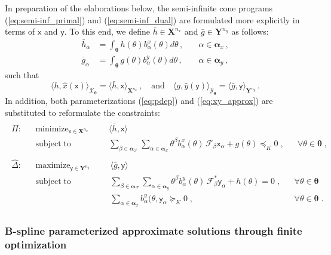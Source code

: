 \documentclass{article}
\DeclareMathOperator*{\minimize}{minimize}
\DeclareMathOperator*{\maximize}{maximize}
\DeclareMathOperator*{\subj}{subject\;to}
\newcommand{\ppar}{\theta}                          %
\newcommand{\Ppar}{{\bm{\theta}}}                   %
\newcommand{\X}{\mathbf{X}}                         %
\newcommand{\Y}{\mathbf{Y}}                         %
\newcommand{\calF}{\mathcal{F}}                     %
\newcommand{\Xm}{{\bm{\mathcal{X}}_{\Ppar}}}        %
\newcommand{\Ym}{{\bm{\mathcal{Y}}_{\Ppar}}}        %
\newcommand{\bx}{b^x}               %
\newcommand{\bxa}{\bx_\alpha}       %
\newcommand{\cx}{\textsf{x}}        %
\newcommand{\cxa}{\cx_\alpha}       %
\newcommand{\nx}{{n_x}}             %
\newcommand{\by}{b^y}               %
\newcommand{\bya}{\by_\alpha}       %
\newcommand{\cy}{\textsf{y}}        %
\newcommand{\cya}{\cy_\alpha}       %
\newcommand{\ny}{{n_y}}             %
\newcommand{\Alpha}{\bm{\alpha}}    %
\newcommand{\meanh}{\bar{h}}        %
\newcommand{\meanha}{\meanh_\alpha} %
\newcommand{\meang}{\bar{g}}        %
\newcommand{\meanga}{\meang_\alpha} %
\begin{document}
In preparation of the elaborations below, the semi-infinite cone programs (\ref{eq:semi-inf_primal}) and (\ref{eq:semi-inf_dual}) are formulated more explicitly in terms of $\cx$ and $\cy$. To this end, we define $\meanh\in\X^\nx$ and $\meang\in\Y^\ny$ as follows:
\[\begin{aligned}
   \meanha &= \int_\Ppar h(\ppar)\bxa(\ppar) d\ppar \,, & \quad\alpha\in\Alpha_x \,,\\%
   \meanga &= \int_\Ppar g(\ppar)\bya(\ppar) d\ppar \,, & \quad\alpha\in\Alpha_y \,,   %
\end{aligned}\]
such that
\[ \langle h, \hat{x}(\cx) \rangle_\Xm = \langle \meanh, \cx \rangle_{\X^\nx} \,,\quad\text{and}\quad%
   \langle g, \hat{y}(\cy) \rangle_\Ym = \langle \meang, \cy \rangle_{\Y^\ny} \,. %
\]
In addition, both parameterizations (\ref{eq:pdep}) and (\ref{eq:xy_approx}) are substituted to reformulate the constraints:
\begin{gather}\label{eq:semi-inf_primal_bis}
\begin{aligned}
\hat{\Pi}: && \minimize_{\cx\in\X^\nx} &&& \langle \meanh, \cx \rangle  \\%
           && \subj                    &&& \sum_{\beta\in\Alpha_\calF}\sum_{\alpha\in\Alpha_x} \ppar^\beta\bxa(\ppar)\,\calF_\beta \cxa + g(\ppar)\preceq_K 0 \;, && \forall \ppar\in\Ppar\;,%
\end{aligned}
\end{gather}
\begin{gather}\label{eq:semi-inf_dual_bis}
\begin{aligned}
\hat{\Delta}: && \maximize_{\cy\in\Y^\ny} &&& \langle \meang, \cy \rangle \\%
              && \subj                    &&& \sum_{\beta\in\Alpha_\calF}\sum_{\alpha\in\Alpha_y} \ppar^\beta\bya(\ppar)\,\calF_\beta^* \cya + h(\ppar)= 0 \;, && \forall \ppar \in\Ppar\\%
              &&                          &&& \sum_{\alpha\in\Alpha_x} \bya(\ppar,\cya \succeq_K 0                  \;, && \forall \ppar \in\Ppar\;.%
\end{aligned}
\end{gather}


\subsubsection{B-spline parameterized approximate solutions through finite optimization}%
\end{document}

